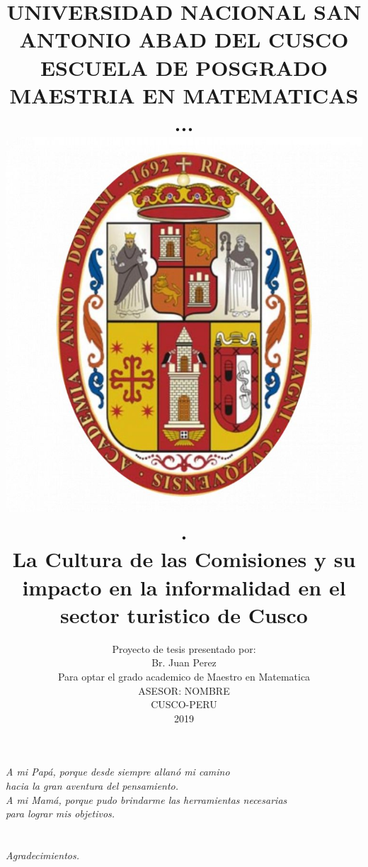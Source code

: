 \documentclass[12pt,oneside]{book}
\title{ 	
		UNIVERSIDAD NACIONAL SAN ANTONIO ABAD DEL CUSCO \\
		{\large  ESCUELA DE POSGRADO}\\
		{\large MAESTRIA EN  MATEMATICAS}\\...\\
		\includegraphics[scale=0.19]{unsaac} \\.\\
		La Cultura de las Comisiones y su impacto en la informalidad en el sector turistico de Cusco }
\author{ Proyecto de tesis presentado por:\\
		Br. Juan Perez\\
		Para optar el grado academico de Maestro en Matematica\\
		ASESOR: NOMBRE\\
		CUSCO-PERU\\
		2019
		}
\begin{document}


\thispagestyle{empty} %


\frontmatter 

\newpage	
\chapter*{}
\thispagestyle{empty}		%
\begin{flushright}
	\vspace*{5cm} 
	\textit{A mi Papá, porque desde siempre allanó mi camino \\ hacia la gran aventura del pensamiento.\\A mi Mamá, porque pudo brindarme las herramientas necesarias\\ para lograr mis objetivos.}
\end{flushright}

\newpage
\chapter*{}
\thispagestyle{empty}		%
\begin{flushright}
	\vspace*{5cm} 
	\textit{Agradecimientos.}
\end{flushright}

	
	\cleardoublepage %
	\tableofcontents
	
	\cleardoublepage %
	\listoftables %
	
\end{document}
